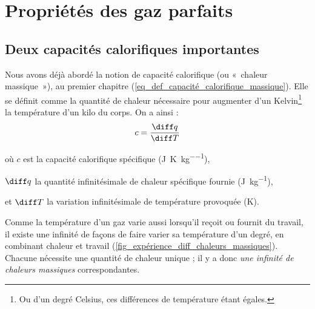 \section{Propriétés des gaz parfaits}

	\subsection{Deux capacités calorifiques importantes}

		Nous avons déjà abordé la notion de capacité calorifique (ou «~chaleur massique~»), au premier chapitre (\ref{eq_def_capacité_calorifique_massique}). Elle se définit comme la quantité de chaleur nécessaire pour augmenter d’un Kelvin\footnote{Ou d’un degré Celsius, ces différences de température étant égales.}
		la température d’un kilo du corps. On a ainsi :
		\begin{equation}
			c = \frac{\diff q}{\diff T}
		\end{equation}
		
		\begin{equationterms}
			\item où \tab $c$ 		\tab\tab est la capacité calorifique spécifique (\si{\joule\per\kelvin\per\kilogram}),
			\item 	\tab $\diff q$ \tab la quantité infinitésimale de chaleur spécifique fournie (\si{\joule\per\kilogram}),
			\item et \tab $\diff T$ \tab la variation infinitésimale de température provoquée (\si{\kelvin}).
		\end{equationterms}

		Comme la température d’un gaz varie aussi lorsqu’il reçoit ou fournit du travail, il existe une infinité de façons de faire varier sa température d’un degré, en combinant chaleur et travail (\cref{fig_expérience_diff_chaleurs_massiques}). Chacune nécessite une quantité de chaleur unique ; il y a donc \textit{une infinité de chaleurs massiques} correspondantes. 

